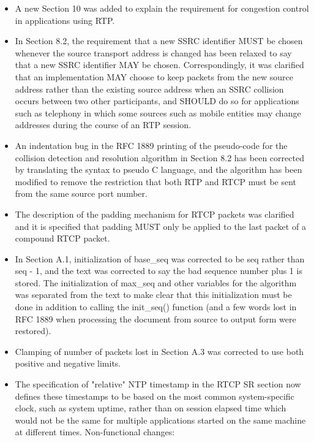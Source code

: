 \documentclass{article}
\begin{document}
\begin{itemize}
\item A new Section 10 was added to explain the requirement for congestion control in applications using RTP.
\item In Section 8.2, the requirement that a new SSRC identifier MUST be chosen whenever the source transport address is changed has been relaxed to say that a new SSRC identifier MAY be chosen. Correspondingly, it was clarified that an implementation MAY
choose to keep packets from the new source address rather than the existing source address when an SSRC collision occurs between two other participants, and SHOULD do so for applications such as telephony in which some sources such as mobile entities may change addresses during the course of an RTP session.

\item An indentation bug in the RFC 1889 printing of the pseudo-code for the collision detection and resolution algorithm in Section 8.2 has been corrected by translating the syntax to pseudo C language, and the algorithm has been modified to remove the restriction that both RTP and RTCP must be sent from the same source port number.
\item The description of the padding mechanism for RTCP packets was clarified and it is specified that padding MUST only be applied to the last packet of a compound RTCP packet.
\item In Section A.1, initialization of base\_seq was corrected to be seq rather than seq - 1, and the text was corrected to say the bad sequence number plus 1 is stored.  The initialization of max\_seq and other variables for the algorithm was separated from the text to make clear that this initialization must be done in addition to calling the init\_seq() function (and a few words lost in RFC 1889 when processing the document from source to output form were restored).
\item Clamping of number of packets lost in Section A.3 was corrected to use both positive and negative limits.
\item The specification of "relative" NTP timestamp in the RTCP SR section now defines these timestamps to be based on the most common system-specific clock, such as system uptime, rather than on session elapsed time which would not be the same for multiple applications started on the same machine at different times.
Non-functional changes:


\end{itemize}
\end{document}
